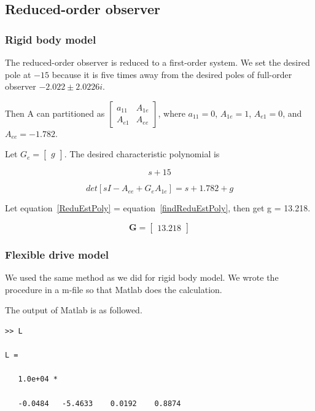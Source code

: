 \documentclass[a4paper, 12pt]{article}
\begin{document}
\newpage
\subsection{Reduced-order observer}
\subsubsection{Rigid body model}
The reduced-order observer is reduced to a first-order system. We set the desired pole at $-15$ because it is five times away from the desired poles of full-order observer $-2.022\pm 2.0226i$. 

Then A can partitioned as $\begin{bmatrix} a_{11} &  A_{1e} \\ 
A_{e1}	&	A_{ee} \end{bmatrix}$, where $a_{11} =0$, $A_{1e} = 1$, $A_{e1} = 0$, and $A_{ee} = -1.782$.

Let $G_e = \begin{bmatrix} g \end{bmatrix}$. The desired characteristic polynomial is 

\begin{equation}\label{ReduEstPoly}
s+15
\end{equation}

\begin{equation}\label{findReduEstPoly}
det[sI - A_{ee} + G_e A_{1e}] = s+1.782+g
\end{equation}

Let equation~\ref{ReduEstPoly} = equation~\ref{findReduEstPoly}, then get g = 13.218.

\begin{equation}\label{ReduG4Rigid}
\mathbf{G} = \begin{bmatrix} 13.218	\end{bmatrix}
\end{equation}

\subsubsection{Flexible drive model}
\hspace{2.5ex} We used the same method as we did for rigid body model. We wrote the procedure in a m-file so that Matlab does the calculation. 

The output of Matlab is as followed.
\begin{verbatim}
>> L

L =

   1.0e+04 *

   -0.0484   -5.4633    0.0192    0.8874
\end{verbatim}
\end{document}
